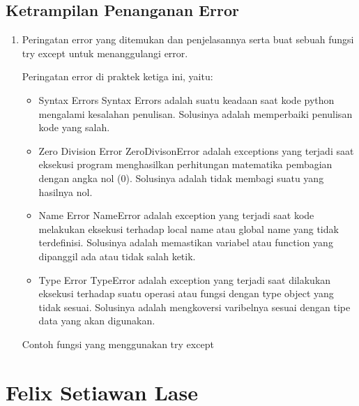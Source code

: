 \subsection{Ketrampilan Penanganan Error}
\begin{enumerate}
	\item Peringatan error yang ditemukan dan penjelasannya serta buat sebuah fungsi try except untuk menanggulangi error.
	
	Peringatan error di praktek ketiga ini, yaitu:
	\begin{itemize}
		\item Syntax Errors
		Syntax Errors adalah suatu keadaan saat kode python mengalami kesalahan penulisan. Solusinya adalah memperbaiki penulisan kode yang salah.
		
		\item Zero Division Error
		ZeroDivisonError adalah exceptions yang terjadi saat eksekusi program menghasilkan perhitungan matematika pembagian dengan angka nol (0). Solusinya adalah tidak membagi suatu yang hasilnya nol.
		
		\item Name Error
		NameError adalah exception yang terjadi saat kode melakukan eksekusi terhadap local name atau global name yang tidak terdefinisi. Solusinya adalah memastikan variabel atau function yang dipanggil ada atau tidak salah ketik.
		
		\item Type Error
		TypeError adalah exception yang terjadi saat dilakukan eksekusi terhadap suatu operasi atau fungsi dengan type object yang tidak sesuai. Solusinya adalah mengkoversi varibelnya sesuai dengan tipe data yang akan digunakan.
	\end{itemize}
	
	Contoh fungsi yang menggunakan try except
	
\end{enumerate}
\section{Felix Setiawan Lase}
